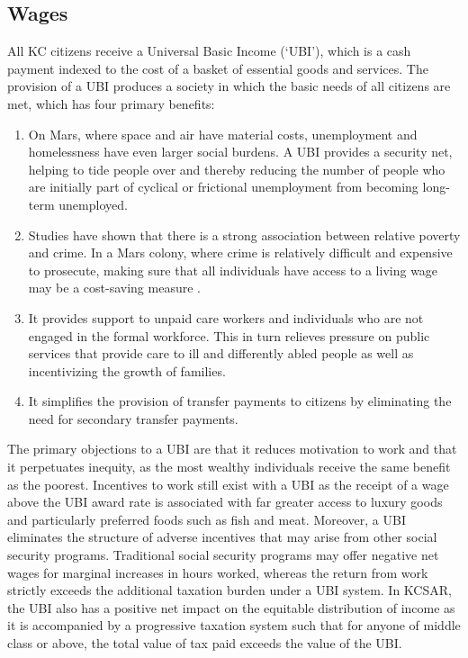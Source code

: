 \documentclass[fleqn,10pt]{Stylesheet} %
\begin{document}
\subsection{Wages}
All KC citizens receive a Universal Basic Income (‘UBI’), which is a cash payment indexed to the cost of a basket of essential goods and services. The provision of a UBI produces a society in which the basic needs of all citizens are met, which has four primary benefits: 

\begin{enumerate}
    \item On Mars, where space and air have material costs, unemployment and homelessness have even larger social burdens. A UBI provides a security net, helping to tide people over and thereby reducing the number of people who are initially part of cyclical or frictional unemployment from becoming long-term unemployed.
    \item Studies have shown that there is a strong association between relative poverty and crime. In a Mars colony, where crime is relatively difficult and expensive to prosecute, making sure that all individuals have access to a living wage may be a cost-saving measure \cite{Hooghe}.
    \item It provides support to unpaid care workers and individuals who are not engaged in the formal workforce. This in turn relieves pressure on public services that provide care to ill and differently abled people as well as incentivizing the growth of families.  
    \item It simplifies the provision of transfer payments to citizens by eliminating the need for secondary transfer payments. 
\end{enumerate}

The primary objections to a UBI are that it reduces motivation to work and that it perpetuates inequity, as the most wealthy individuals receive the same benefit as the poorest. Incentives to work still exist with a UBI as the receipt of a wage above the UBI award rate is associated with far greater access to luxury goods and particularly preferred foods such as fish and meat. Moreover, a UBI eliminates the structure of adverse incentives that may arise from other social security programs. Traditional social security programs may offer negative net wages for marginal increases in hours worked, whereas the return from work strictly exceeds the additional taxation burden under a UBI system. In KCSAR, the UBI also has a positive net impact on the equitable distribution of income as it is accompanied by a progressive taxation system such that for anyone of middle class or above, the total value of tax paid exceeds the value of the UBI. 
\end{document}
